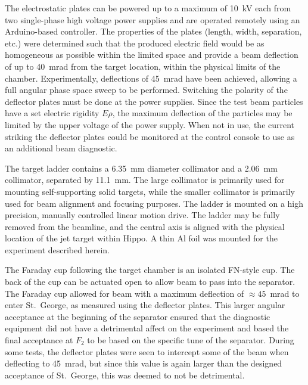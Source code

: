 The electrostatic plates can be powered up to a maximum of 10~kV each
from two single-phase high voltage power supplies and are operated
remotely using an Arduino-based controller. The properties of the plates
(length, width, separation, etc.) were determined such that the produced
electric field would be as homogeneous as possible within the limited
space and provide a beam deflection of up to 40~mrad from the target
location, within the physical limits of the chamber. Experimentally,
deflections of 45~mrad have been achieved, allowing a full angular phase
space sweep to be performed. Switching the polarity of the deflector
plates must be done at the power supplies. Since the test beam particles
have a set electric rigidity $E\rho$, the maximum deflection of the
particles may be limited by the upper voltage of the power supply. When
not in use, the current striking the deflector plates could be monitored
at the control console to use as an additional beam diagnostic.

The target ladder contains a 6.35~mm diameter collimator and a 2.06~mm
collimator, separated by 11.1~mm. The large collimator is primarily used
for mounting self-supporting solid targets, while the smaller collimator
is primarily used for beam alignment and focusing purposes. The ladder
is mounted on a high precision, manually controlled linear motion drive.
The ladder may be fully removed from the beamline, and the central axis
is aligned with the physical location of the jet target within Hippo. A
thin Al foil was mounted for the experiment described herein.

The Faraday cup following the target chamber is an isolated FN-style
cup. The back of the cup can be actuated open to allow beam to pass into
the separator. The Faraday cup allowed for beam with a maximum
deflection of $\approx 45$~mrad to enter St.\ George, as measured using
the deflector plates. This larger angular acceptance at the beginning of
the separator ensured that the diagnostic equipment did not have a
detrimental affect on the experiment and based the final acceptance at
$F_2$ to be based on the specific tune of the separator. During some
tests, the deflector plates were seen to intercept some of the beam when
deflecting to 45~mrad, but since this value is again larger than the
designed acceptance of St.\ George, this was deemed to not be
detrimental.
